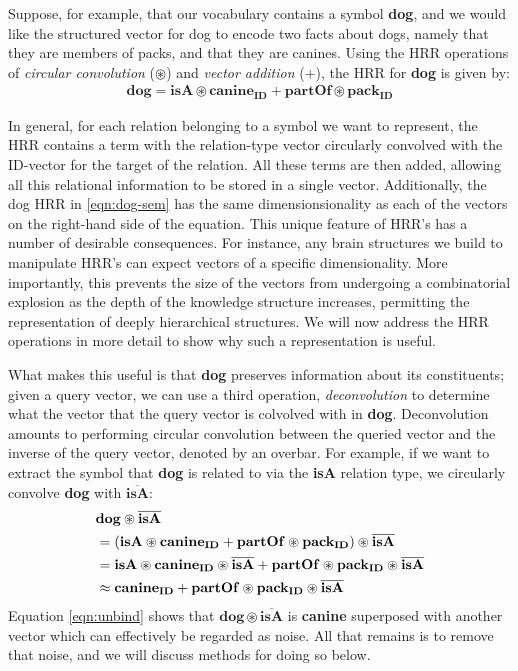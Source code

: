 \documentclass[10pt,letterpaper]{article}
\begin{document}
Suppose, for example, that our vocabulary contains a symbol \textbf{dog}, and we would like the structured vector for dog to encode two facts about dogs, namely that they are members of packs, and that they are canines. Using the HRR operations of \textit{circular convolution} ($\circledast$) and \textit{vector addition} ($+$), the HRR for \textbf{dog} is given by:
\begin{align}
  \mathbf{dog} = \mathbf{isA} \circledast \mathbf{canine_{ID}} + \mathbf{partOf} \circledast \mathbf{pack_{ID}}\label{eqn:dog-sem}
\end{align}

In general, for each relation belonging to a symbol we want to represent, the HRR contains a term with the relation-type vector circularly convolved with the ID-vector for the target of the relation. All these terms are then added, allowing all this relational information to be stored in a single vector. Additionally, the dog HRR in \eqref{eqn:dog-sem} has the same dimensionsionality as each of the vectors on the right-hand side of the equation. This unique feature of HRR's has a number of desirable consequences. For instance, any brain structures we build to manipulate HRR's can expect vectors of a specific dimensionality. More importantly, this prevents the size of the vectors from undergoing a combinatorial explosion as the depth of the knowledge structure increases, permitting the representation of deeply hierarchical structures. We will now address the HRR operations in more detail to show why such a representation is useful.

What makes this useful is that \textbf{dog} preserves information about its constituents; given a query vector, we can use a third operation, \textit{deconvolution} to determine what the vector that the query vector is colvolved with in \textbf{dog}. Deconvolution amounts to performing circular convolution between the queried vector and the inverse of the query vector, denoted by an overbar. For example, if we want to extract the symbol that \textbf{dog} is related to via the \textbf{isA} relation type, we circularly convolve \textbf{dog} with $\overline{\mathbf{isA}}$:
\begin{align}
&\mathbf{dog} \circledast \overline{\mathbf{isA} }\notag\\
&=(\mathbf{isA} \circledast \mathbf{canine_{ID}} + \mathbf{partOf} \circledast \mathbf{pack_{ID}}) \circledast \overline{\mathbf{isA} }\notag\\
&=\mathbf{isA} \circledast \mathbf{canine_{ID}} \circledast \overline{\mathbf{isA} } + \mathbf{partOf} \circledast \mathbf{pack_{ID}} \circledast \overline{\mathbf{isA} }\notag\\
&\approx \mathbf{canine_{ID}} + \mathbf{partOf} \circledast \mathbf{pack_{ID}} \circledast \overline{\mathbf{isA} }\label{eqn:unbind}
\end{align}
Equation \eqref{eqn:unbind} shows that $\mathbf{dog \circledast \overline{isA}}$ is \textbf{canine} superposed with another vector which can effectively be regarded as noise. All that remains is to remove that noise, and we will discuss methods for doing so below.
 
\end{document}
